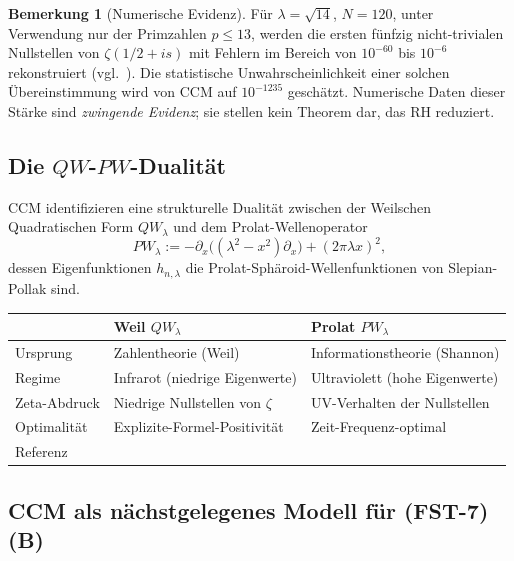 \documentclass[11pt,a4paper]{article}
\theoremstyle{plain}
\theoremstyle{definition}
\newtheorem{remark}[theorem]{Bemerkung}
\begin{document}
\begin{remark}[Numerische Evidenz]\label{rem:ccm-numerics}
Für $\lambda = \sqrt{14}$, $N = 120$, unter Verwendung nur der Primzahlen
$p \leq 13$, werden die ersten fünfzig nicht-trivialen Nullstellen von $\zeta(1/2+is)$
mit Fehlern im Bereich von $10^{-60}$ bis $10^{-6}$ rekonstruiert
(vgl.~\cite[Table~1]{ConnesConsaniMoscovici2025}). Die statistische
Unwahrscheinlichkeit einer solchen Übereinstimmung wird von CCM auf
$10^{-1235}$ geschätzt. Numerische Daten dieser Stärke sind \emph{zwingende Evidenz};
sie stellen kein Theorem dar, das RH reduziert.
\end{remark}

\subsection{Die \texorpdfstring{$QW$-$PW$}{QW-PW}-Dualität}
\label{sec:ccm-duality}

CCM identifizieren eine strukturelle Dualität zwischen der Weilschen
Quadratischen Form $QW_\lambda$ und dem Prolat-Wellenoperator
\[
  PW_\lambda := -\partial_x\big((\lambda^2-x^2)\partial_x\big) +
    (2\pi\lambda x)^2,
\]
dessen Eigenfunktionen $h_{n,\lambda}$ die Prolat-Sphäroid-Wellenfunktionen
von Slepian-Pollak \cite{SlepianPollack1961} sind.

\begin{center}
\small
\begin{tabular}{@{}lll@{}}
\toprule
& \textbf{Weil $QW_\lambda$} & \textbf{Prolat $PW_\lambda$} \\
\midrule
Ursprung        & Zahlentheorie (Weil) & Informationstheorie (Shannon) \\
Regime          & Infrarot (niedrige Eigenwerte) & Ultraviolett (hohe Eigenwerte)\\
Zeta-Abdruck    & Niedrige Nullstellen von $\zeta$ & UV-Verhalten der Nullstellen\\
Optimalität     & Explizite-Formel-Positivität & Zeit-Frequenz-optimal \\
Referenz        & \cite{ConnesConsaniMoscovici2025} & \cite{ConnesMoscovici2022} \\
\bottomrule
\end{tabular}
\end{center}

\subsection{CCM als nächstgelegenes Modell für (FST-7)(B)}
\label{sec:ccm-as-fst7b}
\end{document}
